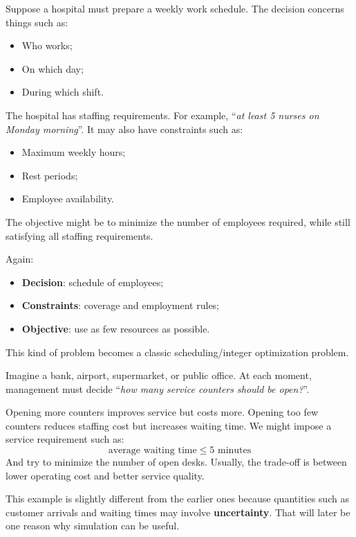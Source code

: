 \highspace
\begin{examplebox}
    Suppose a hospital must prepare a weekly work schedule. The decision concerns things such as:
    \begin{itemize}
        \item Who works;
        \item On which day;
        \item During which shift.
    \end{itemize}
    The hospital has staffing requirements. For example, ``\emph{at least 5 nurses on Monday morning}''. It may also have constraints such as:
    \begin{itemize}
        \item Maximum weekly hours;
        \item Rest periods;
        \item Employee availability.
    \end{itemize}
    The objective might be to minimize the number of employees required, while still satisfying all staffing requirements.

    \highspace
    Again:
    \begin{itemize}
        \item \textbf{Decision}: schedule of employees;
        \item \textbf{Constraints}: coverage and employment rules;
        \item \textbf{Objective}: use as few resources as possible.
    \end{itemize}
    This kind of problem becomes a classic scheduling/integer optimization problem.
\end{examplebox}

\highspace
\begin{examplebox}
    Imagine a bank, airport, supermarket, or public office. At each moment, management must decide ``\emph{how many service counters should be open?}''.

    \highspace
    Opening more counters improves service but costs more. Opening too few counters reduces staffing cost but increases waiting time. We might impose a service requirement such as:
    \begin{equation*}
        \text{average waiting time} \leq 5 \text{ minutes}
    \end{equation*}
    And try to minimize the number of open desks. Usually, the trade-off is between lower operating cost and better service quality.

    \highspace
    This example is slightly different from the earlier ones because quantities such as customer arrivals and waiting times may involve \textbf{uncertainty}. That will later be one reason why simulation can be useful.
\end{examplebox}

